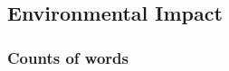 \subsection{Environmental Impact}

%
%

\pagebreak
\subsubsection*{Counts of words} 
\wordcount





